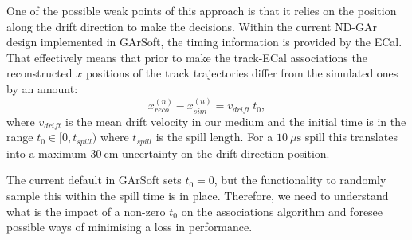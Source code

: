 One of the possible weak points of this approach is that it relies on the position along the drift direction to make the decisions. Within the current ND-GAr design implemented in GArSoft, the timing information is provided by the ECal. That effectively means that prior to make the track-ECal associations the reconstructed $x$ positions of the track trajectories differ from the simulated ones by an amount:
\begin{equation}
	x_{reco}^{(n)} - x_{sim}^{(n)} = v_{drift} \ t_{0},
\end{equation}
where $v_{drift}$ is the mean drift velocity in our medium and the initial time is in the range $t_{0}\in[0, t_{spill})$ where $t_{spill}$ is the spill length. For a $10 \ \mu\mathrm{s}$ spill this translates into a maximum $30 \ \mathrm{cm}$ uncertainty on the drift direction position.

The current default in GArSoft sets $t_{0} = 0$, but the functionality to randomly sample this within the spill time is in place. Therefore, we need to understand what is the impact of a non-zero $t_{0}$ on the associations algorithm and foresee possible ways of minimising a loss in performance.

